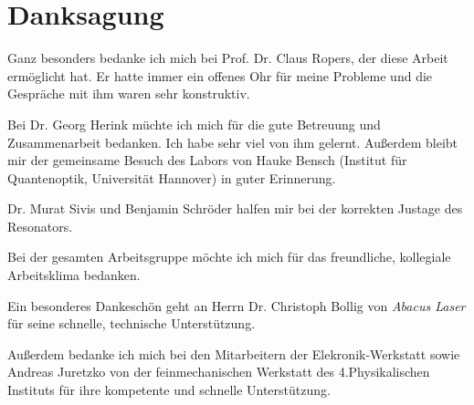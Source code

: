 \documentclass[bachelor,       %
               twoside,        %
               BCOR10mm,       %
               liststotoc,nomtotoc,bibtotoc, %
               english,ngerman, %
               final,          %
               ]{GAUBM}
\begin{document}
\cleardoublepage


\chapter*{Danksagung}
\parindent0mm
\parskip2mm
Ganz besonders bedanke ich mich bei Prof. Dr. Claus Ropers, der diese Arbeit ermöglicht hat.
Er hatte immer ein offenes Ohr für meine Probleme und die Gespräche mit ihm waren sehr konstruktiv.

Bei Dr. Georg Herink müchte ich mich für die gute Betreuung und Zusammenarbeit bedanken.
Ich habe sehr viel von ihm gelernt.
Außerdem bleibt mir der gemeinsame Besuch des Labors von Hauke Bensch (Institut für Quantenoptik, Universität Hannover) in guter Erinnerung.

Dr. Murat Sivis und Benjamin Schröder halfen mir bei der korrekten Justage des Resonators.

Bei der gesamten Arbeitsgruppe möchte ich mich für das freundliche, kollegiale Arbeitsklima bedanken.

Ein besonderes Dankeschön geht an Herrn Dr. Christoph Bollig von \textit{Abacus Laser} für seine schnelle, technische Unterstützung.

Außerdem bedanke ich mich bei den Mitarbeitern der Elekronik-Werkstatt sowie Andreas Juretzko von der feinmechanischen Werkstatt des 4.Physikalischen Instituts für ihre kompetente und schnelle Unterstützung.

\cleardoublepage
\Declaration
\end{document}
